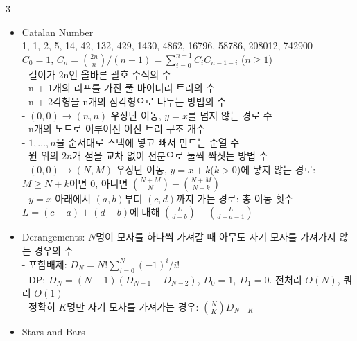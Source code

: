 \documentclass[landscape, 8pt, a4paper, oneside]{extarticle}
\begin{document}
\begin{multicols*}{3}
  
  \begin{itemize}
    \item Catalan Number\\
    1, 1, 2, 5, 14, 42, 132, 429, 1430, 4862, 16796, 58786, 208012, 742900\\
    $C_0=1$, $C_n=\binom{2n}{n}/(n+1)=\sum_{i=0}^{n-1}C_iC_{n-1-i}$ ($n\ge1$)\\
    - 길이가 2n인 올바른 괄호 수식의 수\\
    - n + 1개의 리프를 가진 풀 바이너리 트리의 수\\
    - n + 2각형을 n개의 삼각형으로 나누는 방법의 수\\
    - $(0,0)\to(n,n)$ 우상단 이동, $y=x$를 넘지 않는 경로 수\\
    - n개의 노드로 이루어진 이진 트리 구조 개수\\
    - $1,\ldots,n$을 순서대로 스택에 넣고 빼서 만드는 순열 수\\
    - 원 위의 $2n$개 점을 교차 없이 선분으로 둘씩 짝짓는 방법 수\\
    - $(0,0)\to(N,M)$ 우상단 이동, $y=x+k$($k>0$)에 닿지 않는 경로: $M\ge N+k$이면 0, 아니면 $\binom{N+M}{N}-\binom{N+M}{N+k}$\\
    - $y=x$ 아래에서 $(a,b)$부터 $(c,d)$까지 가는 경로: 총 이동 횟수 $L=(c-a)+(d-b)$에 대해 $\binom{L}{d-b} - \binom{L}{d-a-1}$
    \item Derangements: $N$명이 모자를 하나씩 가져갈 때 아무도 자기 모자를 가져가지 않는 경우의 수\\
    - 포함배제: $D_N=N!\sum_{i=0}^N(-1)^i/i!$\\
    - DP: $D_N=(N-1)(D_{N-1}+D_{N-2})$, $D_0=1,\ D_1=0$. 전처리 $O(N)$, 쿼리 $O(1)$\\
    - 정확히 $K$명만 자기 모자를 가져가는 경우: $\binom{N}{K}D_{N-K}$
    \item Stars and Bars\\

\end{itemize}
\end{multicols*}
\end{document}
